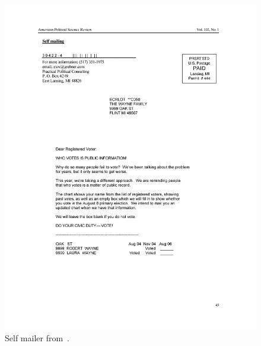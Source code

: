 \documentclass{article}
\begin{document}
\begin{figure}
\centering
\includegraphics[width=\textwidth]{figures/gerber_social_2008_self}
\caption{Self mailer from~\citet{gerber_social_2008}.}
\label{fig:gerber_social_2008_self}
\end{figure} 
 
 
 

\end{document}
